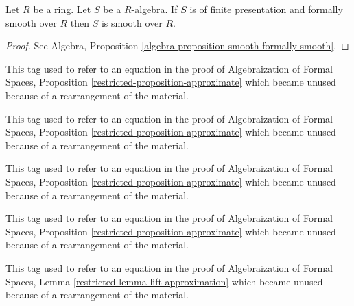 \begin{lemma}
\label{lemma-formally-smooth-smooth}
Let $R$ be a ring. Let $S$ be a $R$-algebra.
If $S$ is of finite presentation and formally smooth over $R$
then $S$ is smooth over $R$.
\end{lemma}

\begin{proof}
See Algebra, Proposition \ref{algebra-proposition-smooth-formally-smooth}.
\end{proof}

\begin{remark}
\label{remark-equation-derivatives}
This tag used to refer to an equation in the proof of
Algebraization of Formal Spaces, Proposition
\ref{restricted-proposition-approximate}
which became unused because of a rearrangement of the material.
\end{remark}

\begin{remark}
\label{remark-equation-ci}
This tag used to refer to an equation in the proof of
Algebraization of Formal Spaces, Proposition
\ref{restricted-proposition-approximate}
which became unused because of a rearrangement of the material.
\end{remark}

\begin{remark}
\label{remark-equation-in-ideal}
This tag used to refer to an equation in the proof of
Algebraization of Formal Spaces, Proposition
\ref{restricted-proposition-approximate}
which became unused because of a rearrangement of the material.
\end{remark}

\begin{remark}
\label{remark-equation-derivatives-analogue}
This tag used to refer to an equation in the proof of
Algebraization of Formal Spaces, Proposition
\ref{restricted-proposition-approximate}
which became unused because of a rearrangement of the material.
\end{remark}

\begin{remark}
\label{remark-equation-go-down}
This tag used to refer to an equation in the proof of
Algebraization of Formal Spaces, Lemma
\ref{restricted-lemma-lift-approximation}
which became unused because of a rearrangement of the material.
\end{remark}

